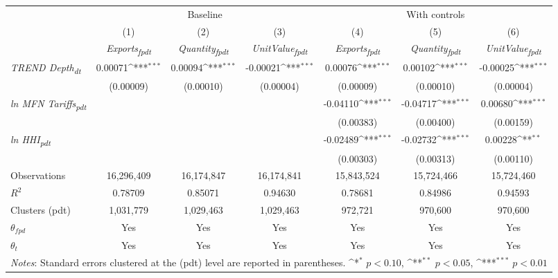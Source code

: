 {
\def\sym#1{\ifmmode^{#1}\else\(^{#1}\)\fi}
\begin{tabular}{l*{6}{c}}
\toprule
&\multicolumn{3}{c}{Baseline}&\multicolumn{3}{c}{With controls}\\\cmidrule(lr){2-4}\cmidrule(lr){5-7}
&(1)&(2)&(3)&(4)&(5)&(6)\\
&\textit{Exports\textsubscript{fpdt}}&\textit{Quantity\textsubscript{fpdt}}&\textit{UnitValue\textsubscript{fpdt}}&\textit{Exports\textsubscript{fpdt}}&\textit{Quantity\textsubscript{fpdt}}&\textit{UnitValue\textsubscript{fpdt}}\\
\midrule
\textit{TREND Depth\textsubscript{dt}} & 0.00071\sym{***} & 0.00094\sym{***} & -0.00021\sym{***} & 0.00076\sym{***} & 0.00102\sym{***} & -0.00025\sym{***}\\
 & (0.00009) & (0.00010) & (0.00004) & (0.00009) & (0.00010) & (0.00004)\\
\addlinespace
\textit{ln MFN Tariffs\textsubscript{pdt}} &  &  &  & -0.04110\sym{***} & -0.04717\sym{***} & 0.00680\sym{***}\\
 &  &  &  & (0.00383) & (0.00400) & (0.00159)\\
\addlinespace
\textit{ln HHI\textsubscript{pdt}} &  &  &  & -0.02489\sym{***} & -0.02732\sym{***} & 0.00228\sym{**}\\
 &  &  &  & (0.00303) & (0.00313) & (0.00110)\\
\midrule
Observations & 16,296,409 & 16,174,847 & 16,174,841 & 15,843,524 & 15,724,466 & 15,724,460\\
$R^{2}$ & 0.78709 & 0.85071 & 0.94630 & 0.78681 & 0.84986 & 0.94593\\
Clusters (pdt) & 1,031,779 & 1,029,463 & 1,029,463 & 972,721 & 970,600 & 970,600\\
$\theta_{fpd}$ & Yes & Yes & Yes & Yes & Yes & Yes\\
$\theta_{t}$ & Yes & Yes & Yes & Yes & Yes & Yes\\
\bottomrule
\multicolumn{7}{l}{\footnotesize \textit{Notes}: Standard errors clustered at the (pdt) level are reported in parentheses. \sym{*} \(p<0.10\), \sym{**} \(p<0.05\), \sym{***} \(p<0.01\)}\\
\end{tabular}
}
